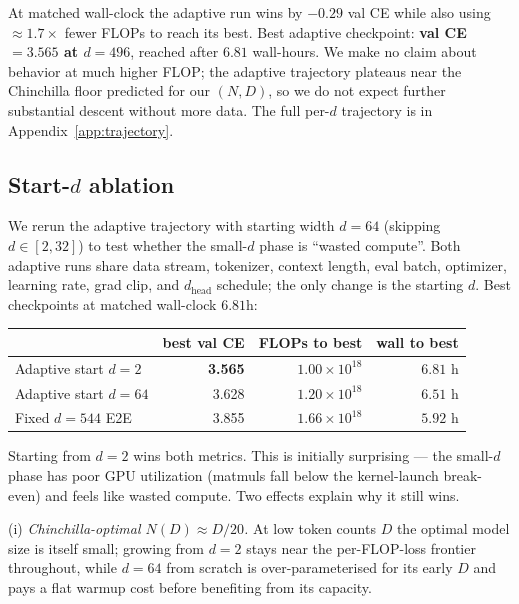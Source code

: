 \documentclass{article}
\begin{document}
At matched wall-clock the adaptive run wins by $-0.29$ val CE while
also using $\approx 1.7{\times}$ fewer FLOPs to reach its best.  Best
adaptive checkpoint: \textbf{val CE $=3.565$ at $d{=}496$}, reached
after $6.81$ wall-hours.  We make no claim about behavior at much
higher FLOP; the adaptive trajectory plateaus near the Chinchilla
floor predicted for our $(N, D)$, so we do not expect further
substantial descent without more data.  The full per-$d$ trajectory
is in Appendix~\ref{app:trajectory}.

\subsection{Start-$d$ ablation}
\label{sec:startd-ablation}

We rerun the adaptive trajectory with starting width $d{=}64$
(skipping $d \in [2, 32]$) to test whether the small-$d$ phase is
``wasted compute''.  Both adaptive runs share data stream, tokenizer,
context length, eval batch, optimizer, learning rate, grad clip, and
$d_{\text{head}}$ schedule; the only change is the starting $d$.
Best checkpoints at matched wall-clock $6.81$h:

\begin{center}
\begin{tabular}{lrrr}
\toprule
 & best val CE & FLOPs to best & wall to best \\
\midrule
Adaptive start $d{=}2$    & \textbf{3.565} & $1.00 \times 10^{18}$ & $6.81$ h \\
Adaptive start $d{=}64$   & 3.628          & $1.20 \times 10^{18}$ & $6.51$ h \\
Fixed $d{=}544$ E2E       & 3.855          & $1.66 \times 10^{18}$ & $5.92$ h \\
\bottomrule
\end{tabular}
\end{center}

Starting from $d{=}2$ wins both metrics.  This is initially
surprising --- the small-$d$ phase has poor GPU utilization (matmuls
fall below the kernel-launch break-even) and feels like wasted
compute.  Two effects explain why it still wins.

(i) \emph{Chinchilla-optimal $N(D) \approx D/20$.}  At low token
counts $D$ the optimal model size is itself small; growing from
$d{=}2$ stays near the per-FLOP-loss frontier throughout, while
$d{=}64$ from scratch is over-parameterised for its early $D$ and
pays a flat warmup cost before benefiting from its capacity.
\end{document}
